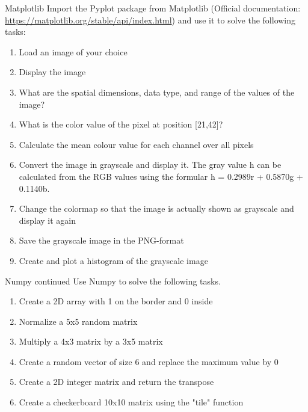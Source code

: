 \documentclass[twoside]{article}
\begin{document}
\clearpage
\begin{task}{Matplotlib}{}{}
Import the Pyplot package from Matplotlib (Official documentation: \href{https://matplotlib.org/stable/api/index.html}{https://matplotlib.org/stable/api/index.html}) and use it to solve the following tasks:

\begin{enumerate}
    \item Load an image of your choice
    \item Display the image
    \item What are the spatial dimensions, data type, and range of the values of the image?
    \item What is the color value of the pixel at position [21,42]?
    \item Calculate the mean colour value for each channel over all pixels
    \item Convert the image in grayscale and display it. The gray value h can be calculated from the RGB values using the formular h = 0.2989r + 0.5870g + 0.1140b.
    \item Change the colormap so that the image is actually shown as grayscale and display it again
    \item Save the grayscale image in the PNG-format
    \item Create and plot a histogram of the grayscale image
\end{enumerate}
\end{task}

\begin{task}{Numpy continued}{}{}
Use Numpy to solve the following tasks.
\begin{enumerate}
    \item Create a 2D array with 1 on the border and 0 inside
    \item Normalize a 5x5 random matrix
    \item Multiply a 4x3 matrix by a 3x5 matrix
    \item Create a random vector of size 6 and replace the maximum value by 0
    \item Create a 2D integer matrix and return the transpose
    \item Create a checkerboard 10x10 matrix using the "tile" function
\end{enumerate}
\end{task}
\end{document}
